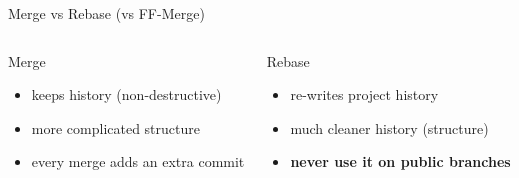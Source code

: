 \begin{frame}{Merge vs Rebase (vs FF-Merge)}
	\begin{columns}
	\begin{column}{0.5\textwidth}
		\centering
		Merge
		\begin{itemize}
			\item keeps history (non-destructive)
			\item more complicated structure
			\item every merge adds an extra commit
		\end{itemize}
	\end{column}
	\begin{column}{0.5\textwidth}
		\centering
		Rebase
		\begin{itemize}
			\item re-writes project history
			\item much cleaner history (structure)
			\item \textbf{never use it on public branches}
		\end{itemize}
	\end{column}
\end{columns}
\end{frame}
